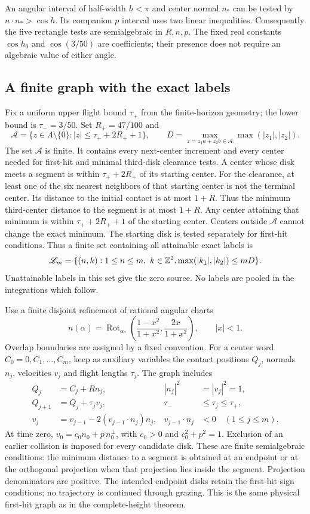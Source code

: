 An angular interval of half-width $h<\pi$ and center normal $n_*$
can be tested by $n\cdot n_*>\cos h$. Its companion $p$ interval
uses two linear inequalities. Consequently the five rectangle tests
are semialgebraic in $R,n,p$. The fixed real constants $\cos h_0$
and $\cos(3/50)$ are coefficients; their presence does not require
an algebraic value of either angle.

\subsection{A finite graph with the exact labels}
Fix a uniform upper flight bound $\tau_+$ from the finite-horizon
geometry; the lower bound is $\tau_-=3/50$. Set $R_+=47/100$ and
\[
 \mathcal A=\{z\in\Lambda\setminus\{0\}:|z|\le\tau_++2R_++1\},
 \qquad D=\max_{z=z_1a+z_2b\in\mathcal A}\max(|z_1|,|z_2|).
\]
The set $\mathcal A$ is finite. It contains every next-center
increment and every center needed for first-hit and minimal
third-disk clearance tests. A center whose disk meets a segment
is within $\tau_++2R_+$ of its starting center. For the clearance,
at least one of the six nearest neighbors of that starting center
is not the terminal center. Its distance to the initial contact
is at most $1+R$. Thus the minimum third-center distance to the
segment is at most $1+R$. Any center attaining that minimum is
within $\tau_++2R_++1$ of the starting center. Centers outside
$\mathcal A$ cannot change the exact minimum. The starting disk
is tested separately for first-hit conditions.
Thus a finite set containing all attainable exact labels is
\begin{equation}\label{eq:v74-label-set}
 \mathscr L_m=\{(n,k):1\le n\le m,\ k\in\Z^2,
                                      \max(|k_1|,|k_2|)\le mD\}.
\end{equation}
Unattainable labels in this set give the zero source. No labels
are pooled in the integrations which follow.

Use a finite disjoint refinement of rational angular charts
\[
 n(\alpha)=\operatorname{Rot}_{\alpha_*}
       \left(\frac{1-x^2}{1+x^2},\frac{2x}{1+x^2}\right),
 \qquad |x|<1.
\]
Overlap boundaries are assigned by a fixed convention. For a center
word $C_0=0,C_1,\ldots,C_m$, keep as auxiliary variables the contact
positions $Q_j$, normals $n_j$, velocities $v_j$ and flight lengths
$\tau_j$. The graph includes
\begin{align*}
 Q_j&=C_j+Rn_j,& |n_j|^2&=|v_j|^2=1,\\
 Q_{j+1}&=Q_j+\tau_jv_j,& \tau_-&\le\tau_j\le\tau_+,\\
 v_j&=v_{j-1}-2(v_{j-1}\cdot n_j)n_j,
       &v_{j-1}\cdot n_j&<0\quad(1\le j\le m).
\end{align*}
At time zero, $v_0=c_0n_0+p\,n_0^\perp$, with
$c_0>0$ and $c_0^2+p^2=1$. Exclusion of an earlier collision is
imposed for every candidate disk. These are finite semialgebraic
conditions: the minimum distance to a segment is obtained at an
endpoint or at the orthogonal projection when that projection lies
inside the segment. Projection denominators are positive. The
intended endpoint disks retain the first-hit sign conditions; no
trajectory is continued through grazing. This is the same physical
first-hit graph as in the complete-height theorem.

